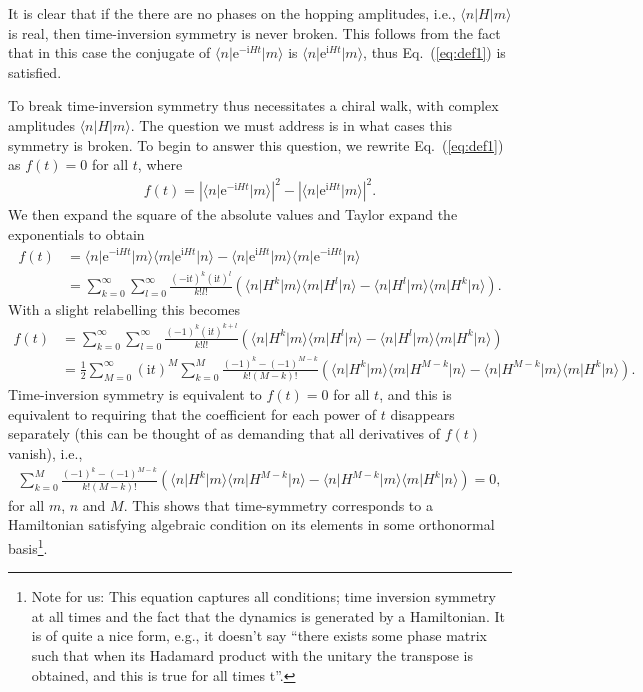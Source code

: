 \documentclass[aps,pra,12pt,nofootinbib,superscriptaddress,longbibliography,showpacs]{revtex4-1}
\theoremstyle{plain}
\theoremstyle{definition}
\newcommand{\bra}[1]{\mbox{$\langle #1|$}}
\newcommand{\ket}[1]{\ensuremath{|#1\rangle}}
\newcommand{\eee}{\mathrm{e}}
\newcommand{\ii}{\mathrm{i}}
\newcommand{\eqr}[1]{Eq.~(\ref{#1})}
\begin{document}
It is clear that if the there are no phases on the hopping amplitudes, i.e., $\bra{n} H \ket{m}$ is real, then time-inversion symmetry is never broken. This follows from the fact that in this case the conjugate of $\bra{n} \eee^{-\ii H t} \ket{m}$ is $\bra{n} \eee^{\ii H t} \ket{m}$, thus \eqr{eq:def1} is satisfied.

To break time-inversion symmetry thus necessitates a chiral walk, with complex amplitudes $\bra{n} H \ket{m}$. The question we must address is in what cases this symmetry is broken. To begin to answer this question, we rewrite \eqr{eq:def1} as $f(t) = 0$ for all $t$, where
\begin{align}
\label{eq:def3}
f(t) = | \bra{n} \eee^{-\ii H t} \ket{m} |^2 - | \bra{n} \eee^{\ii H t} \ket{m} |^2 .
\end{align}
We then expand the square of the absolute values and Taylor expand the exponentials to obtain
\begin{subequations}
\label{eq:def4}
\begin{align}
f(t) &=  \bra{n} \eee^{-\ii H t} \ket{m} \bra{m} \eee^{\ii H t} \ket{n} -  \bra{n} \eee^{\ii H t} \ket{m} \bra{m} \eee^{- \ii H t} \ket{n}  \\
&= \sum_{k=0}^\infty \sum_{l=0}^\infty \frac{(-\ii t)^k (\ii t)^l}{k! l!} \left( \bra{n} H^k \ket{m} \bra{m} H^l \ket{n} -  \bra{n} H^l \ket{m} \bra{m} H^k \ket{n} \right) .
\end{align}
\end{subequations}
With a slight relabelling this becomes
\begin{subequations}
\label{eq:def4}
\begin{align}
f(t) &= \sum_{k=0}^\infty \sum_{l=0}^\infty \frac{(-1)^k (\ii t)^{k+l}}{k! l!} \left( \bra{n} H^k \ket{m} \bra{m} H^l \ket{n} -  \bra{n} H^l \ket{m} \bra{m} H^k \ket{n} \right)  \\
&=  \frac{1}{2} \sum_{M=0 }^\infty (\ii t)^{M} \sum_{k=0}^{M} \frac{ (-1)^k - (-1)^{M-k}}{k! (M-k)!}  \left( \bra{n} H^k \ket{m} \bra{m} H^{M-k} \ket{n} -  \bra{n} H^{M-k}\ket{m} \bra{m} H^k \ket{n} \right) .
\end{align}
\end{subequations}
Time-inversion symmetry is equivalent to $f(t) = 0$ for all $t$, and this is equivalent to requiring that the coefficient for each power of $t$ disappears separately (this can be thought of as demanding that all derivatives of $f(t)$ vanish), i.e.,
\begin{align}
\label{eq:def5}
\sum_{k=0 }^{M} \frac{ (-1)^k - (-1)^{M-k}}{k! (M-k)!}  \left( \bra{n} H^k \ket{m} \bra{m} H^{M-k} \ket{n} -  \bra{n} H^{M-k} \ket{m} \bra{m} H^k \ket{n} \right)  = 0 ,
\end{align}
for all $m$, $n$ and $M$.
This shows that time-symmetry corresponds to a Hamiltonian satisfying algebraic condition on its elements in some orthonormal basis\footnote{Note for us: This equation captures all conditions; time inversion symmetry at all times and the fact that the dynamics is generated by a Hamiltonian. It is of quite a nice form, e.g., it doesn't say ``there exists some phase matrix such that when its Hadamard product with the unitary the transpose is obtained, and this is true for all times t''.}.
\end{document}
